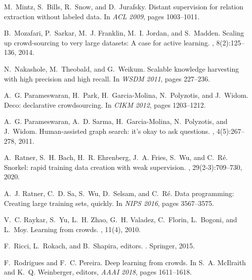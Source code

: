 \documentclass[11pt]{article}
\begin{document}
\begin{thebibliography}{10}
	M.~Mintz, S.~Bills, R.~Snow, and D.~Jurafsky.
	\newblock Distant supervision for relation extraction without labeled data.
	\newblock In {\em {ACL} 2009}, pages 1003--1011.
	
	B.~Mozafari, P.~Sarkar, M.~J. Franklin, M.~I. Jordan, and S.~Madden.
	\newblock Scaling up crowd-sourcing to very large datasets: {A} case for active
	learning.
	, 8(2):125--136, 2014.
	
	N.~Nakashole, M.~Theobald, and G.~Weikum.
	\newblock Scalable knowledge harvesting with high precision and high recall.
	\newblock In {\em {WSDM} 2011}, pages 227--236.
	
	A.~G. Parameswaran, H.~Park, H.~Garcia{-}Molina, N.~Polyzotis, and J.~Widom.
	\newblock Deco: declarative crowdsourcing.
	\newblock In {\em CIKM 2012}, pages 1203--1212.
	
	A.~G. Parameswaran, A.~D. Sarma, H.~Garcia{-}Molina, N.~Polyzotis, and
	J.~Widom.
	\newblock Human-assisted graph search: it's okay to ask questions.
	, 4(5):267--278, 2011.
	
	A.~Ratner, S.~H. Bach, H.~R. Ehrenberg, J.~A. Fries, S.~Wu, and C.~R{\'{e}}.
	\newblock Snorkel: rapid training data creation with weak supervision.
	, 29(2-3):709--730, 2020.
	
	A.~J. Ratner, C.~D. Sa, S.~Wu, D.~Selsam, and C.~R{\'{e}}.
	\newblock Data programming: Creating large training sets, quickly.
	\newblock In {\em NIPS 2016}, pages 3567--3575.
	
	V.~C. Raykar, S.~Yu, L.~H. Zhao, G.~H. Valadez, C.~Florin, L.~Bogoni, and
	L.~Moy.
	\newblock Learning from crowds.
	, 11(4), 2010.
	
	F.~Ricci, L.~Rokach, and B.~Shapira, editors.
	.
	\newblock Springer, 2015.
	
	F.~Rodrigues and F.~C. Pereira.
	\newblock Deep learning from crowds.
	\newblock In S.~A. McIlraith and K.~Q. Weinberger, editors, {\em AAAI 2018},
	pages 1611--1618.
	

\end{thebibliography}
\end{document}
